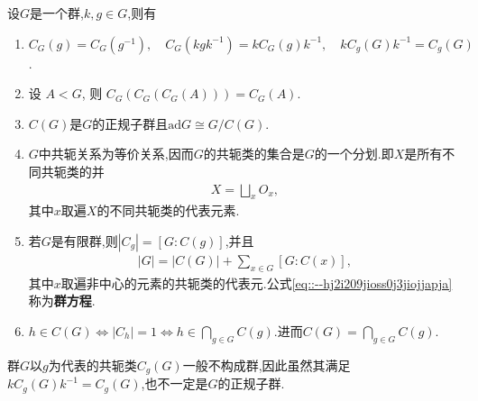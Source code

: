 \documentclass[../../main.tex]{subfiles}%
\begin{document}
\begin{theorem}\label{theorem:中心化子的基本性质}
设$G$是一个群,$k,g\in G$,则有
\begin{enumerate}[(1)]
\item\label{theorem:中心化子的基本性质-0} $C_G(g)=C_G(g^{-1}),\quad C_G(kgk^{-1})=kC_G(g)k^{-1},\quad kC_g(G)k^{-1}=C_g(G)$.

\item 设 $A < G$, 则 $C_G(C_G(C_G(A))) = C_G(A)$.

\item\label{theorem:中心化子的基本性质-1} $C(G)$是$G$的正规子群且$\text{ad}G\cong G/C(G)$.

\item\label{theorem:中心化子的基本性质-2} $G$中共轭关系为等价关系,因而$G$的共轭类的集合是$G$的一个分划.即$X$是所有不同共轭类的并
\begin{align*}
X=\bigsqcup_x O_x,
\end{align*}
其中$x$取遍$X$的不同共轭类的代表元素.

\item\label{theorem:中心化子的基本性质-3} 若$G$是有限群,则$|C_g| = [G: C(g)]$,并且
\begin{align}\label{eq::--hj2i209jioss0j3jiojjapja}
|G| = |C(G)| + \sum_{x\in G}[G:C(x)],
\end{align}
其中$x$取遍非中心的元素的共轭类的代表元.公式\eqref{eq::--hj2i209jioss0j3jiojjapja}称为\textbf{群方程}.

\item\label{theorem:中心化子的基本性质-4} $h \in C(G)\iff |C_h| = 1 \iff h \in \bigcap\limits_{g \in G} C(g)$.进而$C(G)=\bigcap\limits_{g \in G} C(g).$
\end{enumerate}
\end{theorem}
\begin{remark}
群$G$以$g$为代表的共轭类$C_g(G)$一般不构成群,因此虽然其满足$kC_g(G)k^{-1}=C_g(G)$,也不一定是$G$的正规子群.
\end{remark}
\end{document}
